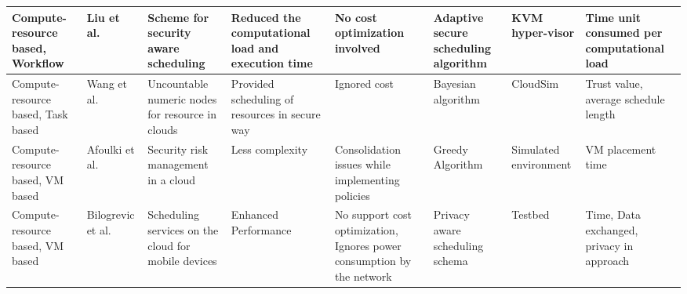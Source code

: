 \begin{sidewaystable*}[!htbp]
{\begin{tabular}{|g{2cm} p{2cm} p{2cm} p{2cm} p{2cm} p{2cm} p{2cm} p{1.9cm}|}
Compute-resource based, Workflow & Liu et al.~\cite{liu2013ccbke} &  Scheme for security aware scheduling &  Reduced the computational load and execution time  & No cost optimization involved & Adaptive secure scheduling algorithm & KVM hyper-visor & Time unit consumed per computational load 
\\ \hline

Compute-resource based, Task based & Wang et al.~\cite{wang2012cloud} & Uncountable numeric nodes for resource in clouds & Provided scheduling of resources in secure way & Ignored cost & Bayesian  algorithm & CloudSim & Trust value, average schedule length 
\\ \hline

Compute-resource based, VM based & Afoulki et al.~\cite{afoulki2011security} & Security risk management in a cloud &  Less complexity & Consolidation issues while implementing policies & Greedy Algorithm & Simulated environment & VM placement time  
\\ \hline 

Compute-resource based, VM based & Bilogrevic et al.~\cite{bilogrevic2011meetings} & Scheduling services on the cloud for mobile devices & Enhanced Performance & No support cost optimization, Ignores power consumption by the network & Privacy aware scheduling schema & Testbed & Time, Data exchanged, privacy in approach 
 \\ \hline
\end{tabular}
}

\end{sidewaystable*}
